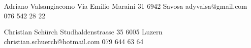 	Adriano Valsangiacomo
	Via Emilio Maraini 31
	6942 Savosa
	adyvalsa@gmail.com
	076 542 28 22
	
	Christian Schürch
	Studhaldenstrasse 35
	6005 Luzern
	christian.schuerch@hotmail.com
	079 644 63 64